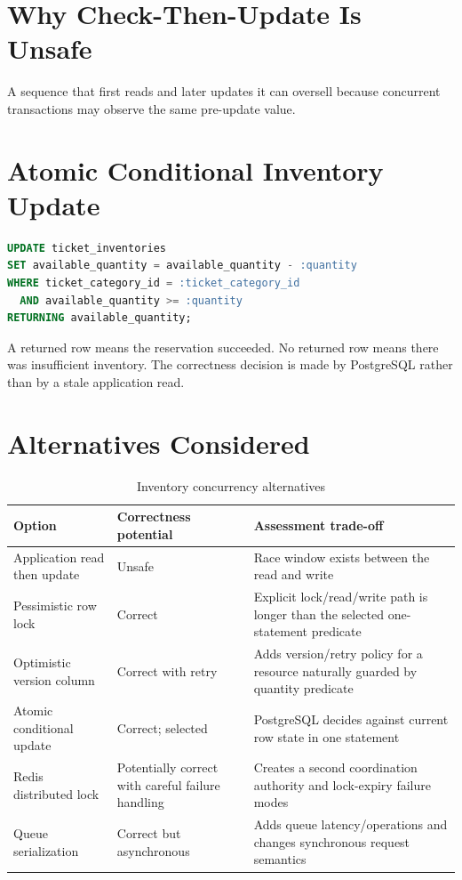 \section{Why Check-Then-Update Is Unsafe}
A sequence that first reads  and later updates it can oversell because concurrent transactions may observe the same pre-update value.

\section{Atomic Conditional Inventory Update}
\begin{lstlisting}[language=SQL,caption={Atomic inventory reservation}]
UPDATE ticket_inventories
SET available_quantity = available_quantity - :quantity
WHERE ticket_category_id = :ticket_category_id
  AND available_quantity >= :quantity
RETURNING available_quantity;
\end{lstlisting}

A returned row means the reservation succeeded. No returned row means there was insufficient inventory. The correctness decision is made by PostgreSQL rather than by a stale application read.

\section{Alternatives Considered}
\begin{table}[H]
\centering
\caption{Inventory concurrency alternatives}
\begin{tabularx}{\textwidth}{p{}p{}Y}
\toprule
\textbf{Option} & \textbf{Correctness potential} & \textbf{Assessment trade-off} \\
\midrule
Application read then update & Unsafe & Race window exists between the read and write \\
Pessimistic row lock & Correct & Explicit lock/read/write path is longer than the selected one-statement predicate \\
Optimistic version column & Correct with retry & Adds version/retry policy for a resource naturally guarded by quantity predicate \\
Atomic conditional update & Correct; selected & PostgreSQL decides against current row state in one statement \\
Redis distributed lock & Potentially correct with careful failure handling & Creates a second coordination authority and lock-expiry failure modes \\
Queue serialization & Correct but asynchronous & Adds queue latency/operations and changes synchronous request semantics \\
\bottomrule
\end{tabularx}
\end{table}

